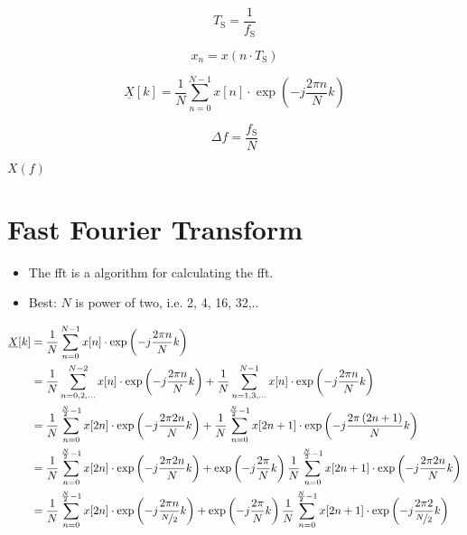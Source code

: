 \documentclass{article}[11pt]
\begin{document}
\begin{equation}\label{eq:ts}
T_{\mathrm{S}} = \frac{1}{f_{\mathrm{S}}}
\end{equation}

\begin{equation}\label{eq:xn}
x_n = x(n \cdot T_{\mathrm{S}})
\end{equation}



\begin{equation}\label{eq:xn}
\underline{X}[k] = \frac{1}{N} \sum_{n=0}^{N-1} 
  x[n] \cdot \exp\left(-j\frac{2\pi n}{N} k\right)
\end{equation}



\begin{equation}\label{eq:resolution}
\Delta f = \frac{f_{\mathrm{S}}}{N}
\end{equation}





$X(f)$

\section{Fast Fourier Transform}

\begin{itemize}
  \item The \gls{fft} is a algorithm for calculating the \gls{fft}.
  \item Best: $N$ is power of two, i.e. 2, 4, 16, 32,..
\end{itemize}

\begin{equation}\label{eq:xn}
\begin{aligned}
\underline{X}[k] 
&= \frac{1}{N} \sum_{n=0}^{N-1} x[n] \cdot \exp\left(-j\frac{2\pi n}{N} k\right) \\
&= \frac{1}{N} \sum_{n=0,2,...}^{N-2} x[n] \cdot \exp\left(-j\frac{2\pi n}{N} k\right) + \frac{1}{N} \sum_{n=1,3,...}^{N-1} x[n] \cdot \exp\left(-j\frac{2\pi n}{N} k\right)  \\
&= \frac{1}{N} \sum_{n=0}^{\frac{N}{2}-1} x[2n] \cdot \exp\left(-j\frac{2\pi 2n}{N} k\right) + \frac{1}{N} \sum_{n=0}^{\frac{N}{2}-1} x[2n+1] \cdot \exp\left(-j\frac{2\pi \left(2n+1\right)}{N} k\right)  \\
&= \frac{1}{N} \sum_{n=0}^{\frac{N}{2}-1} x[2n] \cdot \exp\left(-j\frac{2\pi 2n}{N} k\right) + \exp\left(-j\frac{2\pi}{N} k\right) \frac{1}{N} \sum_{n=0}^{\frac{N}{2}-1} x[2n+1] \cdot \exp\left(-j\frac{2\pi 2n}{N} k\right)  \\
&= \frac{1}{N} \sum_{n=0}^{\frac{N}{2}-1} x[2n] \cdot \exp\left(-j\frac{2\pi n}{\nicefrac{N}{2}} k\right) + \exp\left(-j\frac{2\pi}{N} k\right) \frac{1}{N} \sum_{n=0}^{\frac{N}{2}-1} x[2n+1] \cdot \exp\left(-j\frac{2\pi 2}{\nicefrac{N}{2}} k\right)  \\
\end{aligned}
\end{equation}
\end{document}
